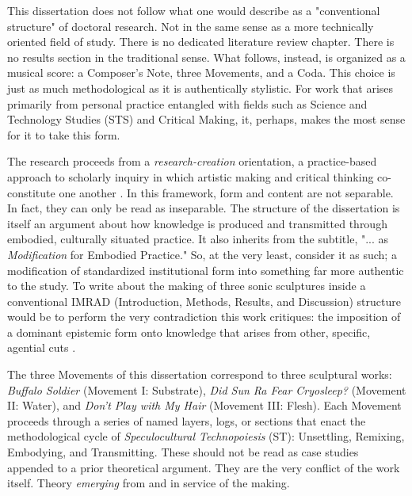 
This dissertation does not follow what one would describe as a "conventional structure" of doctoral research. Not in the same sense as a more technically oriented field of study. There is no dedicated literature review chapter. There is no results section in the traditional sense. What follows, instead, is organized as a musical score: a Composer's Note, three Movements, and a Coda. This choice is just as much methodological as it is authentically stylistic. For work that arises primarily from personal practice entangled with fields such as Science and Technology Studies (STS) and Critical Making, it, perhaps, makes the most sense for it to take this form.  

The research proceeds from a \textit{research-creation} orientation, a practice-based approach to scholarly inquiry in which artistic making and critical thinking co-constitute one another \parencite{Loveless_2019}. In this framework, form and content are not separable. In fact, they can only be read as inseparable. The structure of the dissertation is itself an argument about how knowledge is produced and transmitted through embodied, culturally situated practice. It also inherits from the subtitle, "... as\textit{ Modification} for Embodied Practice." So, at the very least, consider it as such; a modification of standardized institutional form into something far more authentic to the study. To write about the making of three sonic sculptures inside a conventional IMRAD (Introduction, Methods, Results, and Discussion) structure would be to perform the very contradiction this work critiques: the imposition of a dominant epistemic form onto knowledge that arises from other, specific, agential cuts \parencites{Barad_2007}.

The three Movements of this dissertation correspond to three sculptural works: \textit{Buffalo Soldier} (Movement I: Substrate), \textit{Did Sun Ra Fear Cryosleep?} (Movement II: Water), and \textit{Don't Play with My Hair} (Movement III: Flesh). Each Movement proceeds through a series of named layers, logs, or sections that enact the methodological cycle of \textit{Speculocultural Technopoiesis} (ST): Unsettling, Remixing, Embodying, and Transmitting. These should not be read as case studies appended to a prior theoretical argument. They are the very conflict of the work itself. Theory \textit{emerging} from and in service of the making.

